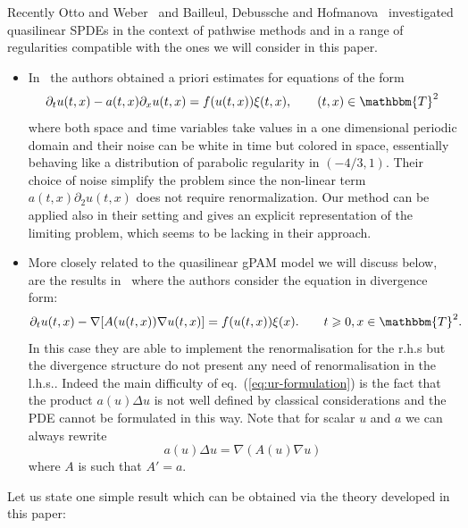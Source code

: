 \documentclass[11pt,reqno]{amsart}
\newenvironment{itemizedot}{\begin{itemize} \renewcommand{\labelitemi}{$\bullet$}\renewcommand{\labelitemii}{$\bullet$}\renewcommand{\labelitemiii}{$\bullet$}\renewcommand{\labelitemiv}{$\bullet$}}{\end{itemize}}
\begin{document}
Recently Otto and Weber~{\cite{otto_quasilinear_2016}} and Bailleul, Debussche
and Hofmanova~{\cite{hofmanova}} investigated quasilinear SPDEs in the context
of pathwise methods and in a range of regularities compatible with the ones we
will consider in this paper.
\begin{itemizedot}
  \item In~{\cite{otto_quasilinear_2016}} the authors obtained a priori
  estimates for equations of the form
  \[ \partial_t u (t, x) - a (t, x) \partial_x u (t, x) = f (u (t, x)) \xi (t,
     x), \qquad (t, x) \in \mathbbm{T}^2 \]
  where both space and time variables take values in a one dimensional
  periodic domain and their noise can be white in time but colored in space,
  essentially behaving like a distribution of parabolic regularity in $(- 4 /
  3, 1)$. Their choice of noise simplify the problem since the non-linear term
  $a (t, x) \partial_2 u (t, x)$ does not require renormalization. Our method
  can be applied also in their setting and gives an explicit representation of
  the limiting problem, which seems to be lacking in their approach.
  
  \item More closely related to the quasilinear gPAM model we will discuss
  below, are the results in~{\cite{hofmanova}} where the authors consider the
  equation in divergence form:
  \begin{equation}
    \partial_t u (t, x) - \nabla [A (u (t, x)) \nabla u (t, x)] = f (u (t, x))
    \xi (x) . \label{eq:deb-hof} \qquad t \geqslant 0, x \in \mathbbm{T}^2 .
  \end{equation}
  In this case they are able to implement the renormalisation for the r.h.s
  but the divergence structure do not present any need of renormalisation in
  the l.h.s.. Indeed the main difficulty of eq.~(\ref{eq:ur-formulation}) is
  the fact that the product $a (u) \Delta u$ is not well defined by classical
  considerations and the PDE cannot be formulated in this way. Note that for
  scalar $u$ and $a$ we can always rewrite
  \[ a (u) \Delta u = \nabla (A (u) \nabla u) \]
  where $A$ is such that $A' = a$.
\end{itemizedot}
Let us state one simple result which can be obtained via the theory developed
in this paper:
\end{document}
